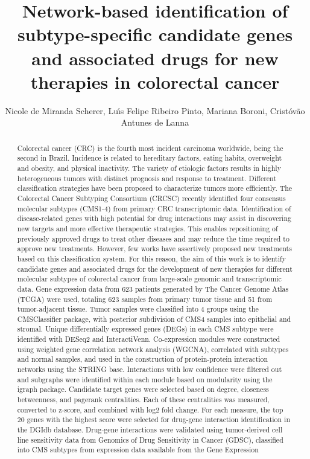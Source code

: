 \documentclass[twoside]{article}
\title{\vspace{-15mm}\fontsize{24pt}{10pt}\selectfont\textbf{ Network-based identification of subtype-specific candidate genes and associated drugs for new therapies in colorectal cancer }} %
\author{ Nicole de Miranda Scherer,  Lu\'{\i}s Felipe Ribeiro Pinto,  Mariana Boroni,  Crist\'ov\~ao Antunes de Lanna }
\affil{ INCA - Instituto Nacional de C\^ancer,  Instituto Nacional de C\^ancer }
\date{}
\begin{document}
  
  
  \maketitle %
  
  
  \thispagestyle{fancy} %
  
  
  \begin{abstract}
  Colorectal cancer (CRC) is the fourth most incident carcinoma worldwide,  being the second in Brazil. Incidence is related to hereditary factors,  eating habits,  overweight and obesity,  and physical inactivity. The variety of etiologic factors results in highly heterogeneous tumors with distinct prognosis and response to treatment. Different classification strategies have been proposed to characterize tumors more efficiently. The Colorectal Cancer Subtyping Consortium (CRCSC) recently identified four consensus molecular subtypes (CMS1-4) from primary CRC transcriptomic data. Identification of disease-related genes with high potential for drug interactions may assist in discovering new targets and more effective therapeutic strategies. This enables repositioning of previously approved drugs to treat other diseases and may reduce the time required to approve new treatments. However,  few works have assertively proposed new treatments based on this classification system. For this reason,  the aim of this work is to identify candidate genes and associated drugs for the development of new therapies for different molecular subtypes of colorectal cancer from large-scale genomic and transcriptomic data. Gene expression data from 623 patients generated by The Cancer Genome Atlas (TCGA) were used,  totaling 623 samples from primary tumor tissue and 51 from tumor-adjacent tissue. Tumor samples were classified into 4 groups using the CMSClassifier package,  with posterior subdivision of CMS4 samples into epithelial and stromal. Unique differentially expressed genes (DEGs) in each CMS subtype were identified with DESeq2 and InteractiVenn. Co-expression modules were constructed using weighted gene correlation network analysis (WGCNA),  correlated with subtypes and normal samples,  and used in the construction of protein-protein interaction networks using the STRING base. Interactions with low confidence were filtered out and subgraphs were identified within each module based on modularity using the igraph package. Candidate target genes were selected based on degree,  closeness betweenness,  and pagerank centralities. Each of these centralities was measured,  converted to z-score,  and combined with log2 fold change. For each measure,  the top 20 genes with the highest score were selected for drug-gene interaction identification in the DGIdb database. Drug-gene interactions were validated using tumor-derived cell line sensitivity data from Genomics of Drug Sensitivity in Cancer (GDSC),  classified into CMS subtypes from expression data available from the Gene Expression 
\end{abstract}
\end{document}
